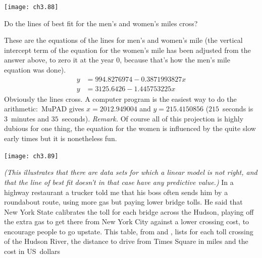 \begin{exercises}
\begin{answer}
    \begin{center}  \small
      \texttt{[image: ch3.88]}
    \end{center}
   \end{answer}   
  \item 
  Do the lines of best fit for the men's and women's miles cross?
  \begin{answer}
    These are the equations of the lines for men's and women's mile 
    (the vertical intercept term of the equation
    for the women's mile has been adjusted from the answer above,
    to zero it at the year $0$,
    because that's how the men's mile equation was done).
    \begin{align*}
        y &=994.8276974-0.3871993827x  \\
        y &=3125.6426-1.445753225x
    \end{align*}
    Obviously the lines cross.
    A computer program  is the easiest way to do the
    arithmetic:~MuPAD gives $x=2012.949004$ and $y=215.4150856$
    ($215$~seconds is $3$~minutes and $35$~seconds).
    \textit{Remark.}
    Of course all of this projection is highly dubious \Dash  for one thing,
    the equation for the women is influenced by the quite slow early 
    times \Dash  but it is nonetheless fun.
     \begin{center}  \small
       \texttt{[image: ch3.89]}
     \end{center}
  \end{answer}
  \item
    \textit{(This illustrates that there are data sets for which a 
    linear model is not right,  and that the line of best fit doesn't
    in that case have any predictive value.)} 
    In a highway restaurant a trucker told me that his boss often sends 
    him by a roundabout route, using more gas
    but paying lower bridge tolls.
    He said that New York State calibrates the 
    toll for each bridge across the Hudson, 
    playing off the extra gas to get there
    from New York City against a lower crossing cost,
    to encourage people to go upstate.
    This table, from \cite{CostOfTolls} and \cite{GoogleMaps},
    lists for each toll crossing of the Hudson River, 
    the distance to drive from Times Square in miles and the cost in US~dollars 

\end{exercises}
